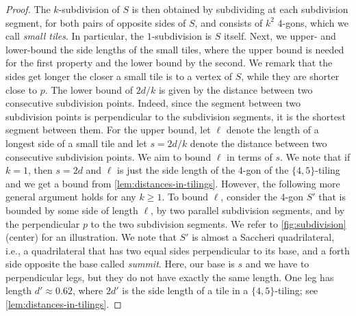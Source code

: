 \documentclass[11pt]{article}
\providecommand{\todo}[2][]{}
\begin{document}
\begin{proof}
    The $ k $-subdivision of $ S $ is then obtained by subdividing at each subdivision segment, for both pairs of opposite sides of $ S $, and consists of $ k^2 $ 4-gons, which we call \emph{small tiles}.
    In particular, the $ 1 $-subdivision is $ S $ itself.
%
    Next, we upper- and lower-bound the side lengths of the small tiles, where the upper bound is needed for the first property and the lower bound by the second.
    We remark that the sides get longer the closer a small tile is to a vertex of $ S $, while they are shorter close to $ p $. 
    The lower bound of $ 2d / k $ is given by the distance between two consecutive subdivision points.
    Indeed, since the segment between two subdivision points is perpendicular to the subdivision segments, it is the shortest segment between them.
%
%     
%
    For the upper bound, let $ \ell $ denote the length of a longest side of a small tile and let $ s = 2d / k $ denote the distance between two consecutive subdivision points.
    We aim to bound $ \ell $ in terms of $ s $.
    We note that if $k = 1$, then $ s = 2d $ and $ \ell $ is just the side length of the 4-gon of the $\{4, 5\}$-tiling and we get a bound from \cref{lem:distances-in-tilings}.
    However, the following more general argument holds for any $k \ge 1$.
    To bound $\ell$, consider the 4-gon $S'$ that is bounded by some side of length $ \ell $, by two parallel subdivision segments, and by the perpendicular $ p $ to the two subdivision segments.
    We refer to \cref{fig:subdivision} (center) for an illustration.
%
    We note that $S'$ is almost a Saccheri quadrilateral, i.e., a quadrilateral that has two equal sides perpendicular to its base, and a forth side opposite the base called \emph{summit}. 
    Here, our base is $ s $ and we have to perpendicular legs, but they do not have exactly the same length.
    One leg has length $ d' \approx 0.62 $, where $ 2d' $ is the side length of a tile in a $ \{ 4, 5\} $-tiling; see \cref{lem:distances-in-tilings}.

\end{proof}
\end{document}
